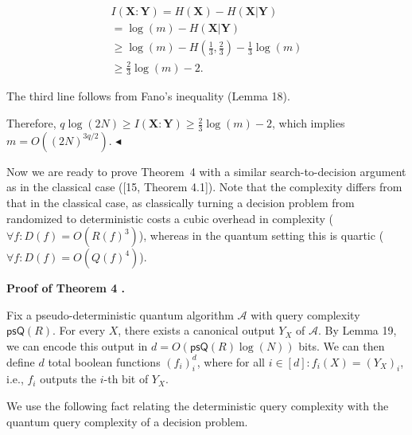 \documentclass[10pt,a4paper]{article}
\begin{document}
\[\begin{gathered}
\displaystyle I(\mathbf{X}:\mathbf{Y}) \displaystyle=H(\mathbf{X})-H(\mathbf{X}|\mathbf{Y}) \\
\displaystyle=\log(m)-H(\mathbf{X}|\mathbf{Y}) \\
\displaystyle\geq\log(m)-H\left(\frac{1}{3},\frac{2}{3}\right)-\frac{1}{3}\log(m) \\
\displaystyle\geq\frac{2}{3}\log(m)-2.
\end{gathered}\]


The third line follows from Fano’s inequality (Lemma 18).\par




Therefore, $q\log(2N)\geq I(\mathbf{X}:\mathbf{Y})\geq\frac{2}{3}\log(m)-2$, which implies $m=O((2N)^{3q/2})$.
$\blacktriangleleft$\par




Now we are ready to prove Theorem 4 with a similar search-to-decision argument as in the classical case ([15, Theorem 4.1]). Note that the complexity differs from that in the classical case, as classically turning a decision problem from randomized to deterministic costs a cubic overhead in complexity ($\forall f:D(f)=O(R(f)^{3})$), whereas in the quantum setting this is quartic ($\forall f:D(f)=O(Q(f)^{4})$).\par





\par\medskip\noindent\textbf{Proof of Theorem 4 .}\par




Fix a pseudo-deterministic quantum algorithm $\mathcal{A}$ with query complexity $\mathsf{psQ}(R)$.
For every $X$, there exists a canonical output $Y_{X}$ of $\mathcal{A}$. By Lemma 19, we can encode this output in $d=O(\mathsf{psQ}(R)\log(N))$ bits.
We can then define $d$ total boolean functions $(f_{i})_{i}^{d}$, where for all $i\in[d]:f_{i}(X)=(Y_{X})_{i}$, i.e., $f_{i}$ outputs the $i$-th bit of $Y_{X}$.\par




We use the following fact relating the deterministic query complexity with the quantum query complexity of a decision problem.\par



\end{document}
